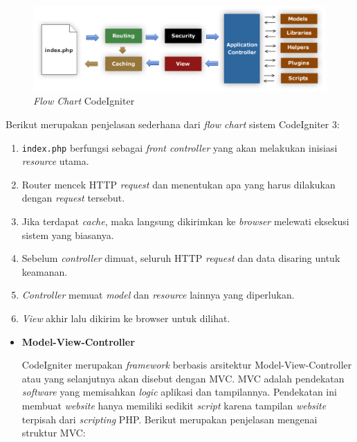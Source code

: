 \documentclass[a4paper,twoside]{article}
\begin{document}
\begin{enumerate}
	      \begin{figure}[H]
		      \centering
		      \includegraphics[scale=0.275]{ci-flowchart.png}
		      \caption{\textit{Flow Chart} CodeIgniter}
		      \label{fig:2:ciflowchart}
	      \end{figure}

	      Berikut merupakan penjelasan sederhana dari \textit{flow chart} sistem CodeIgniter 3:

	      \begin{enumerate}
		      \item \verb|index.php| berfungsi sebagai \textit{front controller} yang akan melakukan inisiasi \textit{resource} utama.
		      \item Router mencek HTTP \textit{request} dan menentukan apa yang harus dilakukan dengan \textit{request} tersebut.
		      \item Jika terdapat \textit{cache}, maka langsung dikirimkan ke \textit{browser} melewati eksekusi sistem yang biasanya.
		      \item Sebelum \textit{controller} dimuat, seluruh HTTP \textit{request} dan data disaring untuk keamanan.
		      \item \textit{Controller} memuat \textit{model} dan \textit{resource} lainnya yang diperlukan.
		      \item \textit{View} akhir lalu dikirim ke browser untuk dilihat.
	      \end{enumerate}

	      \begin{itemize}
		      \item \textbf{Model-View-Controller}
		            \label{sub:2:2:modelviewcontroller}

		            CodeIgniter merupakan \textit{framework} berbasis arsitektur Model-View-Controller atau yang selanjutnya akan disebut dengan MVC. MVC adalah pendekatan \textit{software} yang memisahkan \textit{logic} aplikasi dan tampilannya. Pendekatan ini membuat \textit{website} hanya memiliki sedikit \textit{script} karena tampilan \textit{website} terpisah dari \textit{scripting} PHP. Berikut merupakan penjelasan mengenai struktur MVC:


\end{itemize}
\end{enumerate}
\end{document}
